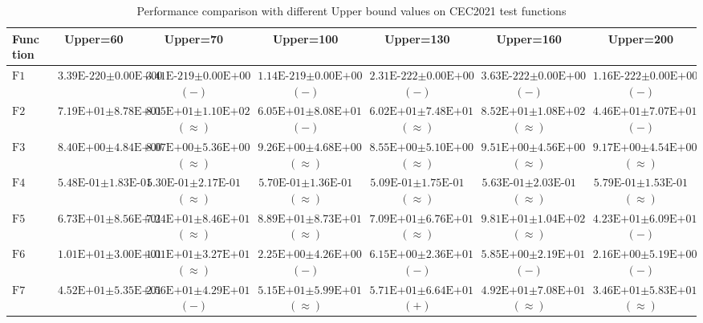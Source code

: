 \begin{table}[htbp]
\centering
\caption{Performance comparison with different Upper bound values on CEC2021 test functions}
\label{tab:Upperbound-comparison}
\begingroup
\scriptsize
\setlength{\tabcolsep}{2pt}
\renewcommand{\arraystretch}{1.05}
\begin{tabular}{lcccccc}
\toprule
Function & Upper=60 & Upper=70 & Upper=100 & Upper=130 & Upper=160 & Upper=200 \\
\midrule
$\text{F1}$ & $\text{3.39E-220}\pm\text{0.00E+00}$ & $\text{3.41E-219}\pm\text{0.00E+00}$ $(-)$ & $\text{1.14E-219}\pm\text{0.00E+00}$ $(-)$ & $\text{2.31E-222}\pm\text{0.00E+00}$ $(-)$ & $\text{3.63E-222}\pm\text{0.00E+00}$ $(-)$ & $\text{1.16E-222}\pm\text{0.00E+00}$ $(-)$ \\
$\text{F2}$ & $\text{7.19E+01}\pm\text{8.78E+01}$ & $\text{8.05E+01}\pm\text{1.10E+02}$ $(\approx)$ & $\text{6.05E+01}\pm\text{8.08E+01}$ $(-)$ & $\text{6.02E+01}\pm\text{7.48E+01}$ $(\approx)$ & $\text{8.52E+01}\pm\text{1.08E+02}$ $(\approx)$ & $\text{4.46E+01}\pm\text{7.07E+01}$ $(-)$ \\
$\text{F3}$ & $\text{8.40E+00}\pm\text{4.84E+00}$ & $\text{8.07E+00}\pm\text{5.36E+00}$ $(\approx)$ & $\text{9.26E+00}\pm\text{4.68E+00}$ $(\approx)$ & $\text{8.55E+00}\pm\text{5.10E+00}$ $(\approx)$ & $\text{9.51E+00}\pm\text{4.56E+00}$ $(\approx)$ & $\text{9.17E+00}\pm\text{4.54E+00}$ $(\approx)$ \\
$\text{F4}$ & $\text{5.48E-01}\pm\text{1.83E-01}$ & $\text{5.30E-01}\pm\text{2.17E-01}$ $(\approx)$ & $\text{5.70E-01}\pm\text{1.36E-01}$ $(\approx)$ & $\text{5.09E-01}\pm\text{1.75E-01}$ $(\approx)$ & $\text{5.63E-01}\pm\text{2.03E-01}$ $(\approx)$ & $\text{5.79E-01}\pm\text{1.53E-01}$ $(\approx)$ \\
$\text{F5}$ & $\text{6.73E+01}\pm\text{8.56E+01}$ & $\text{7.24E+01}\pm\text{8.46E+01}$ $(\approx)$ & $\text{8.89E+01}\pm\text{8.73E+01}$ $(\approx)$ & $\text{7.09E+01}\pm\text{6.76E+01}$ $(\approx)$ & $\text{9.81E+01}\pm\text{1.04E+02}$ $(\approx)$ & $\text{4.23E+01}\pm\text{6.09E+01}$ $(-)$ \\
$\text{F6}$ & $\text{1.01E+01}\pm\text{3.00E+01}$ & $\text{1.01E+01}\pm\text{3.27E+01}$ $(\approx)$ & $\text{2.25E+00}\pm\text{4.26E+00}$ $(-)$ & $\text{6.15E+00}\pm\text{2.36E+01}$ $(-)$ & $\text{5.85E+00}\pm\text{2.19E+01}$ $(-)$ & $\text{2.16E+00}\pm\text{5.19E+00}$ $(-)$ \\
$\text{F7}$ & $\text{4.52E+01}\pm\text{5.35E+01}$ & $\text{2.56E+01}\pm\text{4.29E+01}$ $(-)$ & $\text{5.15E+01}\pm\text{5.99E+01}$ $(\approx)$ & $\text{5.71E+01}\pm\text{6.64E+01}$ $(+)$ & $\text{4.92E+01}\pm\text{7.08E+01}$ $(\approx)$ & $\text{3.46E+01}\pm\text{5.83E+01}$ $(\approx)$ \\

\end{tabular}
\end{table}
